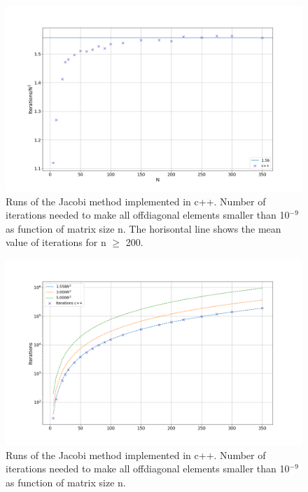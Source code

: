 \begin{figure}[H]
  \centering
  \includegraphics[width=1.0\textwidth]{../figures/iterations_compare_n2.png}
  \caption{Runs of the Jacobi method implemented in c++. Number of iterations
  needed to make all offdiagonal elements smaller than 10$^{-9}$ as function of
  matrix size n. The horisontal line shows the mean value of iterations for
  n $\geq$ 200.}

  \label{fig:iterations_scaled}
\end{figure}


\begin{figure}[H]
  \centering
  \includegraphics[width=1.0\textwidth]{../figures/iterations.png}

  \caption{Runs of the Jacobi method implemented in c++. Number of iterations
  needed to make all offdiagonal elements smaller than 10$^{-9}$ as function of
  matrix size n.}

  \label{fig:iterations}
\end{figure}


